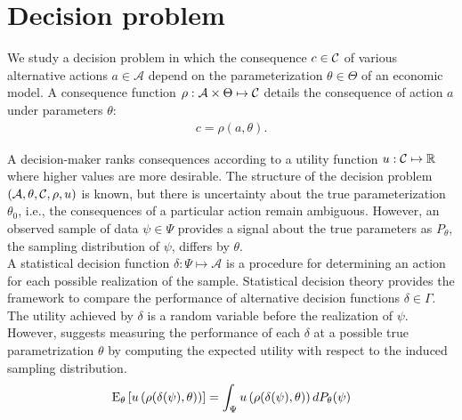 \section{Decision problem}
We study a decision problem in which the consequence $c \in \mathcal{C}$ of various alternative actions $a\in\mathcal{A}$ depend on the parameterization $\theta\in \Theta$ of an economic model. A consequence function $\rho: \mathcal{A} \times \Theta \mapsto \mathcal{C}$  details the consequence of action $a$ under parameters $\theta$:
%
\begin{align*}
c = \rho(a, \theta).
\end{align*}

A decision-maker ranks consequences according to a utility function $u: \mathcal{C} \mapsto \mathbb{R}$ where higher values are more desirable. The structure of the decision problem $(\mathcal{A}, \theta, \mathcal{C}, \rho, u)$ is known, but there is uncertainty about the true parameterization $\theta_0$, i.e., the consequences of a particular action remain ambiguous. However, an observed sample of data $\psi \in \Psi$ provides a signal about the true parameters as $P_{\theta}$, the sampling distribution of $\psi$, differs by $\theta$.\\

A statistical decision function $\delta: \Psi \mapsto \mathcal{A}$ is a procedure for determining an action for each possible realization of the sample.
Statistical decision theory provides the framework to compare the performance of alternative decision functions  $\delta \in \Gamma$. The utility achieved by $\delta$ is a random variable before the realization of $\psi$. However, \citet{Wald.1950} suggests measuring the performance of each $\delta$ at a possible true parametrization $\theta$ by computing the expected utility with respect to the induced sampling distribution.
%
\begin{align*}
  \mathrm{E}_{\theta}\left[u\left(\rho(\delta(\psi), \theta)\right)\right] = \int_\Psi u\left(\rho(\delta(\psi), \theta)\right) d P_{\theta}(\psi)
\end{align*}
%

